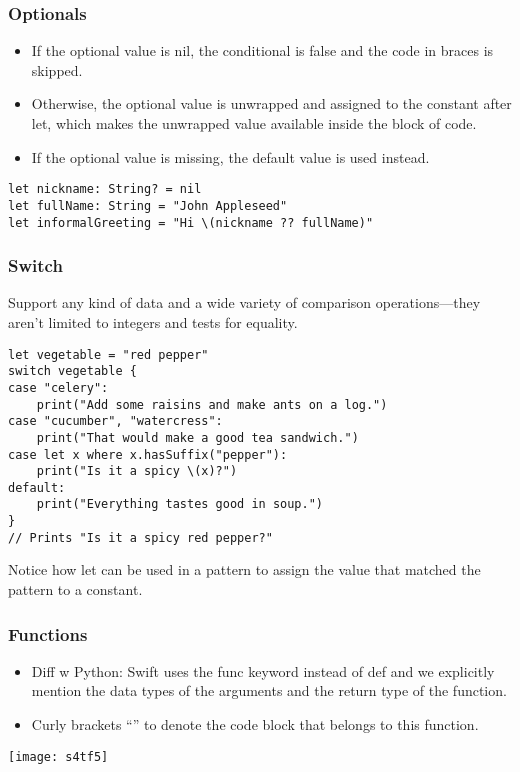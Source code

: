 \begin{frame}[fragile] \frametitle{Optionals}

\begin{itemize}
\item If the optional value is nil, the conditional is false and the code in braces is skipped. 
\item Otherwise, the optional value is unwrapped and assigned to the constant after let, which makes the unwrapped value available inside the block of code.
\item If the optional value is missing, the default value is used instead.
\end{itemize}

\begin{lstlisting}
let nickname: String? = nil
let fullName: String = "John Appleseed"
let informalGreeting = "Hi \(nickname ?? fullName)"
\end{lstlisting}

\end{frame}

\begin{frame}[fragile] \frametitle{Switch}

Support any kind of data and a wide variety of comparison operations—they aren’t limited to integers and tests for equality.
 
\begin{lstlisting}
let vegetable = "red pepper"
switch vegetable {
case "celery":
    print("Add some raisins and make ants on a log.")
case "cucumber", "watercress":
    print("That would make a good tea sandwich.")
case let x where x.hasSuffix("pepper"):
    print("Is it a spicy \(x)?")
default:
    print("Everything tastes good in soup.")
}
// Prints "Is it a spicy red pepper?"
\end{lstlisting}

Notice how let can be used in a pattern to assign the value that matched the pattern to a constant.

\end{frame}


\begin{frame}[fragile] \frametitle{Functions}

\begin{itemize}
\item Diff w Python: Swift uses the func keyword instead of def and we explicitly mention the data types of the arguments and the return type of the function.
\item Curly brackets “{}” to denote the code block that belongs to this function.
\end{itemize}


\begin{center}
\texttt{[image: s4tf5]}
\end{center}

\end{frame}

